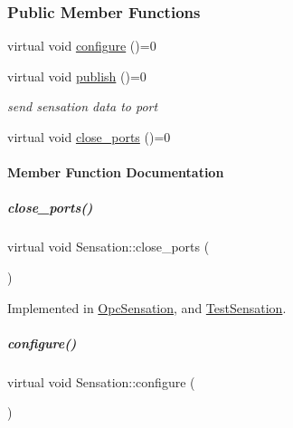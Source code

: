 \subsubsection*{Public Member Functions}
\begin{DoxyCompactItemize}
\item 
virtual void \hyperlink{group__sensationManager_a118f1c62b03a665c9f80496dcf3124f6}{configure} ()=0
\item 
virtual void \hyperlink{group__sensationManager_ad37c802d993694d36f6794e597b35c8c}{publish} ()=0
\begin{DoxyCompactList}\small\item\em send sensation data to port \end{DoxyCompactList}\item 
virtual void \hyperlink{group__sensationManager_a432fd7cefc45b46a5b4316be787c8e4b}{close\+\_\+ports} ()=0
\end{DoxyCompactItemize}


\paragraph{Member Function Documentation}
\mbox{\label{group__sensationManager_a432fd7cefc45b46a5b4316be787c8e4b}} 
\subparagraph{\texorpdfstring{close\+\_\+ports()}{close\_ports()}}
{\footnotesize\ttfamily virtual void Sensation\+::close\+\_\+ports (\begin{DoxyParamCaption}{ }\end{DoxyParamCaption})\hspace{0.3cm}{\ttfamily [pure virtual]}}



Implemented in \hyperlink{group__sensationManager_a53a2ff62e9cecdeeef5f62a23dba8afc}{Opc\+Sensation}, and \hyperlink{group__sensationManager_adfca7f97bb5a9c16c172f43462a7b762}{Test\+Sensation}.

\mbox{\label{group__sensationManager_a118f1c62b03a665c9f80496dcf3124f6}} 
\subparagraph{\texorpdfstring{configure()}{configure()}}
{\footnotesize\ttfamily virtual void Sensation\+::configure (\begin{DoxyParamCaption}{ }\end{DoxyParamCaption})\hspace{0.3cm}{\ttfamily [pure virtual]}}



